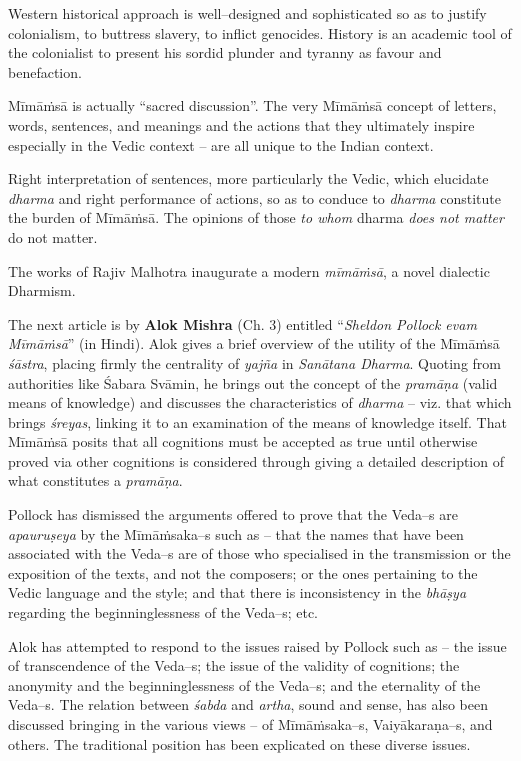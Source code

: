 Western historical approach is well–designed and sophisticated so as to justify colonialism, to buttress slavery, to inflict genocides. History is an academic tool of the colonialist to present his sordid plunder and tyranny as favour and benefaction.

Mīmāṁsā is actually “sacred discussion”. The very Mīmāṁsā concept of letters, words, sentences, and meanings and the actions that they ultimately inspire especially in the Vedic context – are all unique to the Indian context.

Right interpretation of sentences, more particularly the Vedic, which elucidate \textit{dharma} and right performance of actions, so as to conduce to \textit{dharma} constitute the burden of Mīmāṁsā. The opinions of those \textit{to whom} dharma \textit{does not matter} do not matter.

The works of Rajiv Malhotra inaugurate a modern \textit{mīmāṁsā}, a novel dialectic Dharmism.

The next article is by \textbf{Alok Mishra} (Ch. 3) entitled “\textit{Sheldon Pollock evam Mīmāṁsā}” (in Hindi). Alok gives a brief overview of the utility of the Mīmāṁsā \textit{śāstra}, placing firmly the centrality of \textit{yajña} in \textit{Sanātana Dharma}. Quoting from authorities like Śabara Svāmin, he brings out the concept of the \textit{pramāṇa} (valid means of knowledge) and discusses the characteristics of \textit{dharma} – viz. that which brings \textit{śreyas}, linking it to an examination of the means of knowledge itself. That Mīmāṁsā posits that all cognitions must be accepted as true until otherwise proved via other cognitions is considered through giving a detailed description of what constitutes a \textit{pramāṇa}.

Pollock has dismissed the arguments offered to prove that the Veda–s are \textit{apauruṣeya} by the Mīmāṁsaka–s such as – that the names that have been associated with the Veda–s are of those who specialised in the transmission or the exposition of the texts, and not the composers; or the ones pertaining to the Vedic language and the style; and that there is inconsistency in the \textit{bhāṣya} regarding the beginninglessness of the Veda–s; etc.

Alok has attempted to respond to the issues raised by Pollock such as – the issue of transcendence of the Veda–s; the issue of the validity of cognitions; the anonymity and the beginninglessness of the Veda–s; and the eternality of the Veda–s. The relation between \textit{śabda} and \textit{artha}, sound and sense, has also been discussed bringing in the various views – of Mīmāṁsaka–s, Vaiyākaraṇa–s, and others. The traditional position has been explicated on these diverse issues.

